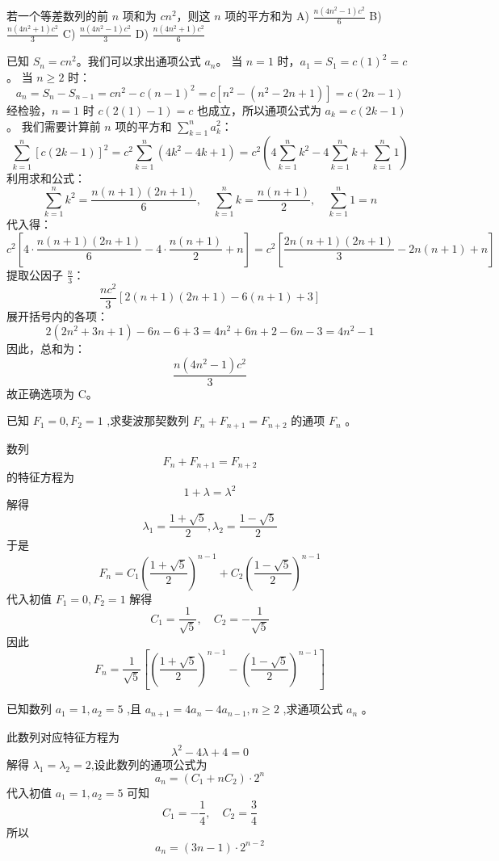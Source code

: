 \begin{questions}
    \question 若一个等差数列的前 $n$ 项和为 $cn^2$，则这 $n$ 项的平方和为
A) $\frac{n(4n^2 - 1)c^2}{6}$ \qquad B) $\frac{n(4n^2 + 1)c^2}{3}$ \qquad C) $\frac{n(4n^2 - 1)c^2}{3}$ \qquad D) $\frac{n(4n^2 + 1)c^2}{6}$

\begin{solution}
已知 $S_n = cn^2$。我们可以求出通项公式 $a_n$。
当 $n=1$ 时，$a_1 = S_1 = c(1)^2 = c$。
当 $n \ge 2$ 时：
\[
a_n = S_n - S_{n-1} = cn^2 - c(n-1)^2 = c[n^2 - (n^2 - 2n + 1)] = c(2n - 1)
\]
经检验，$n=1$ 时 $c(2(1)-1) = c$ 也成立，所以通项公式为 $a_k = c(2k - 1)$。
我们需要计算前 $n$ 项的平方和 $\sum_{k=1}^n a_k^2$：
\[
\sum_{k=1}^n [c(2k - 1)]^2 = c^2 \sum_{k=1}^n (4k^2 - 4k + 1) = c^2 \left( 4 \sum_{k=1}^n k^2 - 4 \sum_{k=1}^n k + \sum_{k=1}^n 1 \right)
\]
利用求和公式：
\[
\sum_{k=1}^n k^2 = \frac{n(n+1)(2n+1)}{6}, \quad \sum_{k=1}^n k = \frac{n(n+1)}{2}, \quad \sum_{k=1}^n 1 = n
\]
代入得：
\[
c^2 \left[ 4 \cdot \frac{n(n+1)(2n+1)}{6} - 4 \cdot \frac{n(n+1)}{2} + n \right] = c^2 \left[ \frac{2n(n+1)(2n+1)}{3} - 2n(n+1) + n \right]
\]
提取公因子 $\frac{n}{3}$：
\[
\frac{nc^2}{3} [2(n+1)(2n+1) - 6(n+1) + 3]
\]
展开括号内的各项：
\[
2(2n^2 + 3n + 1) - 6n - 6 + 3 = 4n^2 + 6n + 2 - 6n - 3 = 4n^2 - 1
\]
因此，总和为：
\[
\frac{n(4n^2 - 1)c^2}{3}
\]
故正确选项为 C。
\end{solution}

    \question 已知 $F_1 = 0, F_2 = 1$ ,求斐波那契数列 $F_n + F_{n+1} = F_{n+2}$ 的通项 $F_n$ 。
    \begin{solution}
        数列
        \[
        F_n + F_{n+1} = F_{n+2}
        \]
        的特征方程为 
        \[
        1 + \lambda = \lambda^2
        \]
        解得
        \[
        \lambda_1 = \frac{1+\sqrt{5}}{2}, \lambda_2 = \frac{1-\sqrt{5}}{2}
        \]
        于是 
        \[
        F_n = C_1 \left( \frac{1+\sqrt{5}}{2} \right)^{n-1} + C_2 \left( \frac{1-\sqrt{5}}{2} \right)^{n-1}
        \]
        代入初值 $F_1 = 0, F_2 = 1$ 解得
        \[
        C_1 = \frac{1}{\sqrt{5}},\quad C_2 = -\frac{1}{\sqrt{5}}
        \]
        因此 
        \[
        F_n = \frac{1}{\sqrt{5}} \left[ \left( \frac{1+\sqrt{5}}{2} \right)^{n-1} - \left( \frac{1-\sqrt{5}}{2} \right)^{n-1} \right]
        \]
    \end{solution}

    \question 已知数列 $a_1 = 1, a_2 = 5$ ,且 $a_{n+1} = 4a_n - 4a_{n-1}, n \ge 2$ ,求通项公式 $a_n$ 。
    \begin{solution}
        此数列对应特征方程为 
        \[
        \lambda^2 - 4\lambda + 4 = 0
        \]
        解得 $\lambda_1 = \lambda_2 = 2$,设此数列的通项公式为 
        \[
        a_n = (C_1 + nC_2) \cdot 2^n
        \]
        代入初值 $a_1 = 1, a_2 = 5$ 可知
        \[
        C_1 = -\frac{1}{4},\quad C_2 = \frac{3}{4}
        \]
        所以 
        \[
        a_n = (3n-1) \cdot 2^{n-2}
        \]
    \end{solution}


\end{questions}
